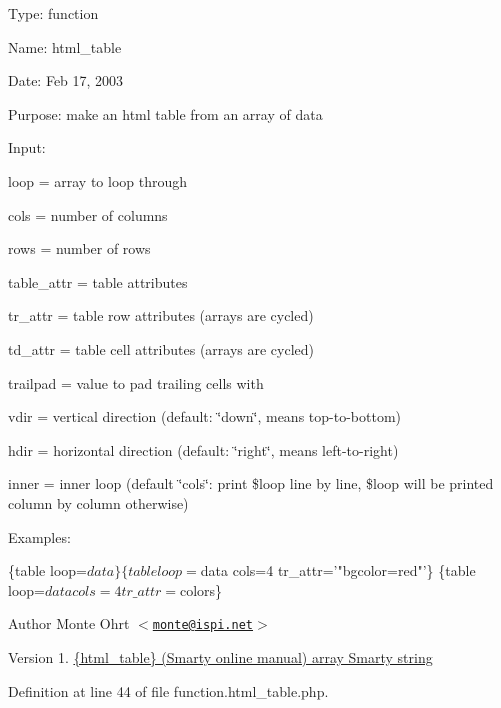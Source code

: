 \-Type\-: function\par
 \-Name\-: html\-\_\-table\par
 \-Date\-: \-Feb 17, 2003\par
 \-Purpose\-: make an html table from an array of data\par
 \-Input\-:\par

\begin{DoxyItemize}
\item loop = array to loop through
\item cols = number of columns
\item rows = number of rows
\item table\-\_\-attr = table attributes
\item tr\-\_\-attr = table row attributes (arrays are cycled)
\item td\-\_\-attr = table cell attributes (arrays are cycled)
\item trailpad = value to pad trailing cells with
\item vdir = vertical direction (default\-: \char`\"{}down\char`\"{}, means top-\/to-\/bottom)
\item hdir = horizontal direction (default\-: \char`\"{}right\char`\"{}, means left-\/to-\/right)
\item inner = inner loop (default \char`\"{}cols\char`\"{}\-: print \$loop line by line, \$loop will be printed column by column otherwise)
\end{DoxyItemize}

\-Examples\-: 
\begin{DoxyPre}
 \{table loop=$data\}
 \{table loop=$data cols=4 tr\_attr='"bgcolor=red"'\}
 \{table loop=$data cols=4 tr\_attr=$colors\}
 \end{DoxyPre}
 \begin{DoxyAuthor}{\-Author}
\-Monte \-Ohrt $<$\href{mailto:monte@ispi.net}{\tt monte@ispi.\-net}$>$ 
\end{DoxyAuthor}
\begin{DoxyVersion}{\-Version}
1. \hyperlink{}{\{html\-\_\-table\} (\-Smarty online manual)  array  \-Smarty  string }
\end{DoxyVersion}


\-Definition at line 44 of file function.\-html\-\_\-table.\-php.


